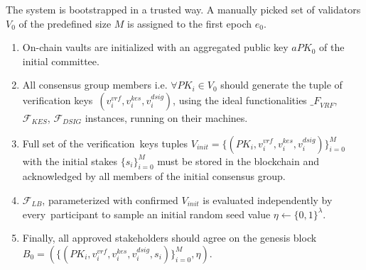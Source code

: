 The system is bootstrapped in a trusted way.
A manually picked set of validators $V_0$ of the predefined size $M$ is assigned to the first epoch $e_0$.
\begin{enumerate}
    \item On-chain vaults are initialized with an aggregated public key $aPK_0$ of the initial committee.

    \item All consensus group members i.e. $\forall PK_i \in V_0$ should generate the tuple of verification keys\
    ${(v_i^{vrf}, v_i^{kes}, v_i^{dsig})}$, using the ideal functionalities ${\mathcal_{F}}_{VRF}$,\
    ${\mathcal{F}}_{KES}$, ${\mathcal{F}}_{DSIG}$ instances, running on their machines.

    \item Full set of the verification\
    keys tuples ${V_{init} = \{(PK_i, v_i^{vrf}, v_i^{kes}, v_i^{dsig})\}_{i=0}^M}$ with the initial stakes $\{s_i\}_{i=0}^M$
    must be stored in the blockchain and acknowledged by all members of the initial consensus group.

    \item ${\mathcal{F}}_{LB}$, parameterized with confirmed $V_{init}$ is evaluated independently by every\
    participant to sample an initial random seed value $\eta \leftarrow \{0, 1\}^\lambda$.

    \item Finally, all approved stakeholders should agree on the genesis block\
    ${B_0=\left(\{(PK_i, v_i^{vrf}, v_i^{kes}, v_i^{dsig}, s_i)\}_{i=0}^M, \eta\right)}$.
\end{enumerate}

